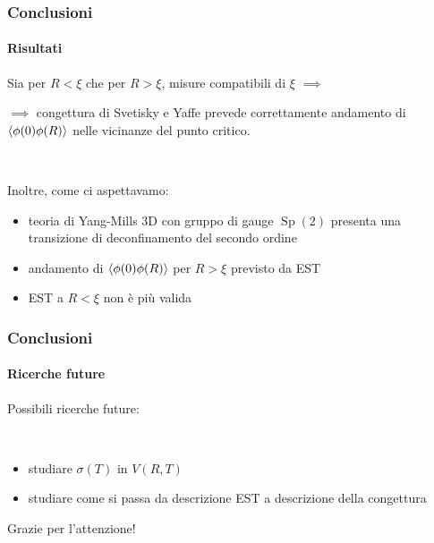 \documentclass{beamer}
\newcommand{\Sp}{\operatorname{Sp}}
\begin{document}
\begin{frame}
	\frametitle{Conclusioni}
	\framesubtitle{Risultati}

	Sia per $R < \xi$ che per $R > \xi$, misure compatibili di $\xi$ $\implies$

	$\implies$ \alert{congettura di Svetisky e Yaffe prevede correttamente andamento di $\expval{\phi(0) \phi(R)}$} nelle vicinanze
	del punto critico.

	\

	Inoltre, come ci aspettavamo:

	\begin{itemize}
		\item teoria di Yang-Mills 3D con gruppo di gauge $\Sp(2)$ presenta una transizione di deconfinamento del
		secondo ordine
		\item andamento di $\expval{\phi(0)\phi(R)}$ per $R > \xi$ previsto da EST
		\item EST a $R < \xi$ non è più valida
	\end{itemize}

\end{frame}

\begin{frame}
	\frametitle{Conclusioni}
	\framesubtitle{Ricerche future}
	
	Possibili ricerche future:

	\

	\begin{itemize}
		\item studiare $\sigma(T)$ in $V(R, T)$
		\item studiare come si passa da descrizione EST a descrizione della congettura
	\end{itemize}

\end{frame}

\begin{frame}

	\centering
	\Huge
	Grazie per l'attenzione!	

\end{frame}
\end{document}
